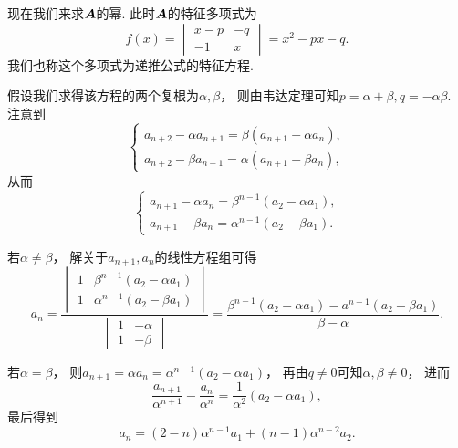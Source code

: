 现在我们来求\(\boldsymbol{A}\)的幂.
此时\(\boldsymbol{A}\)的特征多项式为\begin{equation*}
	f(x)
	= \begin{vmatrix}
		x-p & -q \\
		-1 & x
	\end{vmatrix}
	= x^2 - px - q.
\end{equation*}
我们也称这个多项式为递推公式的特征方程.

假设我们求得该方程的两个复根为\(\alpha,\beta\)，
则由韦达定理可知\(p=\alpha+\beta, q=-\alpha\beta\).
注意到\begin{equation*}
	\left\{ \begin{array}{l}
		a_{n+2} - \alpha a_{n+1} = \beta(a_{n+1}-\alpha a_n), \\
		a_{n+2} - \beta a_{n+1} = \alpha(a_{n+1}-\beta a_n),
	\end{array} \right.
\end{equation*}
从而\begin{equation*}
	\left\{ \begin{array}{l}
		a_{n+1} - \alpha a_n = \beta^{n-1} (a_2 - \alpha a_1), \\
		a_{n+1} - \beta a_n = \alpha^{n-1} (a_2 - \beta a_1).
	\end{array} \right.
\end{equation*}

若\(\alpha\neq\beta\)，
解关于\(a_{n+1},a_n\)的线性方程组可得\begin{equation*}
	a_n
	= \frac
		{
			\begin{vmatrix}
				1 & \beta^{n-1}(a_2 - \alpha a_1) \\
				1 & \alpha^{n-1}(a_2 - \beta a_1)
			\end{vmatrix}
		}
		{
			\begin{vmatrix}
				1 & -\alpha \\
				1 & -\beta
			\end{vmatrix}
		}
	= \frac{\beta^{n-1} (a_2 - \alpha a_1) - a^{n-1} (a_2 - \beta a_1)}{\beta-\alpha}.
\end{equation*}

若\(\alpha=\beta\)，
则\(a_{n+1} = \alpha a_n = \alpha^{n-1} (a_2 - \alpha a_1)\)，
再由\(q\neq0\)可知\(\alpha,\beta\neq0\)，
进而\begin{equation*}
	\frac{a_{n+1}}{\alpha^{n+1}} - \frac{a_n}{\alpha^n}
	= \frac{1}{\alpha^2}(a_2-\alpha a_1),
\end{equation*}
最后得到\begin{equation*}
	a_n = (2-n)\alpha^{n-1} a_1 + (n-1) \alpha^{n-2} a_2.
\end{equation*}


